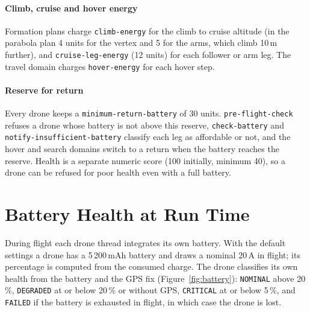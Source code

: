 \documentclass[11pt,a4paper,oneside]{report}
\newcommand{\code}[1]{\texttt{#1}}
\begin{document}
\paragraph{Climb, cruise and hover energy}
Formation plans charge \code{climb-energy} for the climb to cruise altitude (in the parabola
plan 4 units for the vertex and 5 for the arms, which climb 10\,m further), and
\code{cruise-leg-energy} (12 units) for each follower or arm leg. The travel domain charges
\code{hover-energy} for each hover step.

\paragraph{Reserve for return}
Every drone keeps a \code{minimum-return-battery} of 30 units. \code{pre-flight-check} refuses a
drone whose battery is not above this reserve, \code{check-battery} and
\code{notify-insufficient-battery} classify each leg as affordable or not, and the hover and
search domains switch to a return when the battery reaches the reserve. Health is a separate
numeric score (100 initially, minimum 40), so a drone can be refused for poor health even with a
full battery.

\section{Battery Health at Run Time}
During flight each drone thread integrates its own battery. With the default settings a drone has
a 5\,200\,mAh battery and draws a nominal 20\,A in flight; its percentage is computed from the
consumed charge. The drone classifies its own health from the battery and the GPS fix
(Figure~\ref{fig:battery}): \code{NOMINAL} above 20\,\%, \code{DEGRADED} at or below 20\,\% or
without GPS, \code{CRITICAL} at or below 5\,\%, and \code{FAILED} if the battery is exhausted in
flight, in which case the drone is lost.
\end{document}
